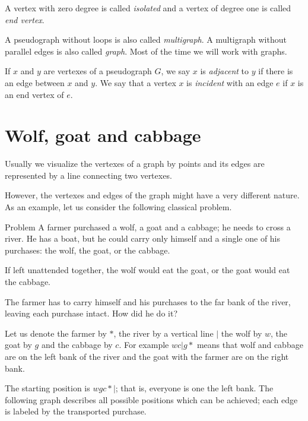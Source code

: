 A vertex with zero degree is called \emph{isolated} and a vertex of degree one is called \emph{end vertex}.

\smallskip

A pseudograph without loops is also called \emph{multigraph}.
A multigraph without parallel edges is also called \emph{graph}.
Most of the time we will work with graphs.

If $x$ and $y$ are vertexes of a pseudograph $G$, we say $x$ is \emph{adjacent} to $y$ if there is an edge between $x$ and $y$.
We say that a vertex $x$ is \emph{incident} with an edge $e$ if $x$ is an end vertex of $e$.

\section*{Wolf, goat and cabbage}

Usually we visualize the vertexes of a graph by points
and its edges are represented by a line connecting two vertexes.

However, the vertexes and edges of the graph might have a very different nature.
As an example, let us consider the following classical problem.

\begin{thm}{Problem}
A farmer purchased a wolf, a goat and a cabbage;
he needs to cross a river.
He has a boat, but he could carry only himself and a single one of his purchases: the wolf, the goat, or the cabbage.

If left unattended together, the wolf would eat the goat, or the goat would eat the cabbage.

The farmer has to carry himself and his purchases to the far bank of the river, leaving each purchase intact. How did he do it?
\end{thm}

Let us denote the farmer by $*$, the river by a vertical line $|$
the wolf by $w$, the goat by $g$ and the cabbage by $c$.
For example $wc|g{*}$ means that wolf and cabbage are on the left bank of the river and the goat with the farmer are on the right bank.

The starting position is $wgc{*}|$; that is, everyone is one the left bank.
The following graph describes all possible positions which can be achieved; each edge is labeled by the transported purchase.

